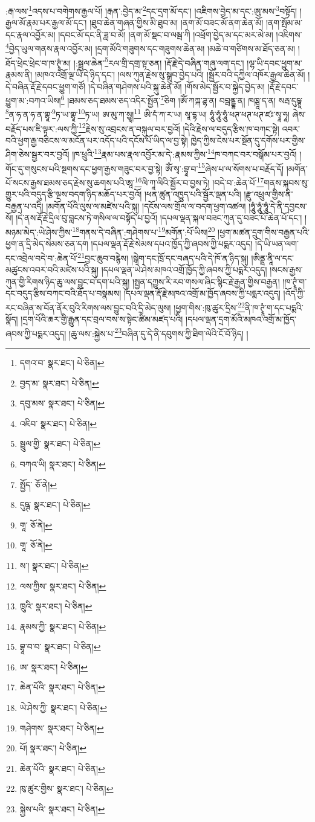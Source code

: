 :རྒ་ལས་\footnote{དགའ་བ་  སྣར་ཐང་།  པེ་ཅིན། }འདས་པ་བགེགས་རྒྱལ་པོ། །རྒན་:བྱེད་མ་\footnote{བྱད་མ་  སྣར་ཐང་།  པེ་ཅིན། }དང་དྲག་མོ་དང་། །འཇིགས་བྱེད་མ་དང་:ཨུ་མས་\footnote{དབུ་མས་  སྣར་ཐང་།  པེ་ཅིན། }བསྟོད། །རྒྱལ་མོ་རྣམ་པར་རྒྱལ་མོ་དང་། །ཐུབ་ཆེན་གཞན་གྱིས་མི་ཐུབ་མ། །ནག་མོ་བཟང་མོ་ནག་ཆེན་མོ། །ནག་སྤོམ་མ་དང་རྣལ་འབྱོར་མ། །དབང་མོ་དང་ནི་ཟླ་བ་མོ། །ནག་མོ་སྡང་བ་ལམྦ་ཀི །འཕྲོག་བྱེད་མ་དང་མར་མེ་མ། །འཇིགས་\footnote{འཇིབ་  སྣར་ཐང་།  པེ་ཅིན། }བྱེད་ཡུལ་གནས་རྣལ་འབྱོར་མ། །དྲག་མོའི་གཟུགས་དང་གཟུགས་ཆེན་མ། །མཆེ་བ་གཙིགས་མ་ཐོད་ཅན་མ། །ཐོད་ཕྲེང་ཕྲེང་བ་ཁ་ཊྭཱཾ་མ། །:སྦྲུལ་ཆེན་\footnote{སྦྲུལ་གྱི་  སྣར་ཐང་།  པེ་ཅིན། }རལ་གྲི་དགྲ་སྟ་ཅན། །རྡོ་རྗེ་དེ་བཞིན་གཞུ་ལག་དང་། །ལྷ་ཡི་དབང་ཕྱུག་མ་རྣམས་ནི། །མཁའ་འགྲོ་ལྔ་ཡི་དེ་ཉིད་དང་། །ལས་ཀུན་རྗེས་སུ་སྒྲུབ་བྱེད་པའི། །སྦྱོར་བའི་དཀྱིལ་འཁོར་རྒྱལ་ཆེན་མོ། །དེ་བཞིན་རྡོ་རྗེ་དབང་ཕྱུག་གཙོ། །དེ་བཞིན་གཤེགས་པའི་སྐུ་ཆེན་མོ། །གོས་མེད་སྦྱོར་བ་སྐྱེད་བྱེད་མ། །རྡོ་རྗེ་དབང་ཕྱུག་མ་:བཀའ་ཡིས།\footnote{བཀའ་ཡི།  སྣར་ཐང་།  པེ་ཅིན། } །ཐམས་ཅད་ཐམས་ཅད་འདིར་སྤྱོན་\footnote{སྤྱོད་  ཅོ་ནེ། }ཅིག །ཨོཾ་ཀཀྐ་ཌྷ་ན། བབྦནྡྷ་ན། ཁཁྑཱ་ད་ན། སརྦ་དུཥྚཱ་\footnote{དུཥྚ་  སྣར་ཐང་།  པེ་ཅིན། }ན་ཧ་ན་ཧ་ན་གྷཱ་\footnote{གཱ་  ཅོ་ནེ། }ཏ་ཡ་གྷཱ་\footnote{གཱ་  ཅོ་ནེ། }ཏ་ཡ། ཨ་མུ་ཀ་སྱཱ།\footnote{ས་།  སྣར་ཐང་།  པེ་ཅིན། } ཨི་དཾ་ཀ་ར་ཡ། སཱ་དྷ་ཡ། ཧཱུཾ་ཧཱུཾ་ཧཱུཾ་ཕཊ་ཕཊ་ཕཊ་ཛཿ་སྭཱ་ཧཱ། ཞེས་བརྗོད་པས་ཇི་ལྟར་:ལས་ཀྱི་\footnote{ལས་ཀྱིས་  སྣར་ཐང་།  པེ་ཅིན། }རྗེས་སུ་འབྲངས་ན་བསྐུལ་བར་བྱའོ། །དེའི་རྗེས་ལ་བདུད་རྩིས་ཁ་བཀང་སྟེ། འབར་བའི་ཕྱག་རྒྱ་བཅིངས་ལ་མངོན་པར་འདོད་པའི་དངོས་པོ་ཡིད་ལ་བྱ་སྟེ། ཁྱེད་ཀྱིས་ངེས་པར་སྔོན་དུ་དགོས་པར་གྱིས་ཤིག་ཅེས་སྦྱར་བར་བྱའོ། །ཁ་ཕྲུའི་\footnote{ཁྲུའི་  སྣར་ཐང་།  པེ་ཅིན། }རྣམ་པས་རྣལ་འབྱོར་མ་དེ་:རྣམས་ཀྱིས་\footnote{རྣམས་ཀྱི་  སྣར་ཐང་།  པེ་ཅིན། }ཁ་བཀང་བར་བསྒོམ་པར་བྱའོ། །གོང་དུ་གསུངས་པའི་སྔགས་དང་ཕྱག་རྒྱས་གཟུང་བར་བྱ་སྟེ། ཨོཾ་སྭ་:བྷཱ་བ་\footnote{བྷཱ་བ་བ་  སྣར་ཐང་།  པེ་ཅིན། }ཞེས་པ་ལ་སོགས་པ་བརྗོད་དོ། །མགོན་པོ་སངས་རྒྱས་ཐམས་ཅད་རྗེས་སུ་ཆགས་པའི་ཨཱ་\footnote{ཨ་  སྣར་ཐང་།  པེ་ཅིན། }ལི་ཀཱ་ལིའི་སྦྱོར་བ་བྱས་ཏེ། །བདེ་བ་:ཆེན་པོ་\footnote{ཆེན་པོའི་  སྣར་ཐང་།  པེ་ཅིན། }གནས་སྐབས་སུ་གྱུར་པའི་བདུད་རྩི་ལྔས་བདག་ཉིད་མཆོད་པར་བྱའོ། །ཕན་ཚུན་འཁྱུད་པའི་སྦྱོར་ལྡན་པའི། །རྫུ་འཕྲུལ་གྱིས་ནི་བརྒྱན་པ་འདི། །མགོན་པོའི་ལུས་ལ་མཛེས་པའི་སྐུ། །དངོས་ལས་གྲོལ་ལ་བདག་ཕྱག་འཚལ། །ཧཱུཾ་ཧཱུཾ་ཧཱུཾ་དེ་ནི་དབྱངས་སོ། །དེ་ནས་རྡོ་རྗེ་དྲིལ་བུ་བླངས་ཏེ་གསིལ་ལ་བསྟོད་པ་བྱའོ། །དཔལ་ལྡན་སྐལ་བཟང་ཀུན་དུ་བཟང་པོ་ཆེན་པོ་དང་། །མཉམ་མེད་:ཡེ་ཤེས་ཀྱིས་\footnote{ཡེ་ཤེས་ཀྱི་  སྣར་ཐང་།  པེ་ཅིན། }གནས་དེ་བཞིན་:གཤེགས་པ་\footnote{གཤེགས་  སྣར་ཐང་།  པེ་ཅིན། }མགོན་:པོ་ཡིས།\footnote{པོ།  སྣར་ཐང་།  པེ་ཅིན། } །ཕྱག་མཚན་དྲུག་གིས་བརྒྱན་པའི་ཕྱག་ན་དྲི་མེད་སེམས་ཅན་དག །དཔལ་ལྡན་རྡོ་རྗེ་སེམས་དཔའ་ཁྱོད་ཀྱི་ཞབས་ཀྱི་པདྨར་འདུད། །དེ་ཡི་ཡན་ལག་དང་འབྲེལ་བདེ་བ་:ཆེན་པོ་\footnote{ཆེན་པོའི་  སྣར་ཐང་།  པེ་ཅིན། }བྱང་ཆུབ་བརྙེས། །སྒེག་དང་ཁྲོ་དང་བཞད་པའི་དེ་ཁོ་ན་ཉིད་སྐུ། །ཨིནྡྲ་ནཱི་ལ་དང་མཚུངས་འབར་བའི་མཛེས་པའི་སྐུ། །དཔལ་ལྡན་ཡེ་ཤེས་མཁའ་འགྲོ་ཁྱོད་ཀྱི་ཞབས་ཀྱི་པདྨར་འདུད། །སངས་རྒྱས་ཀུན་གྱི་རིགས་ཉིད་ཆུ་ལས་བྱུང་བ་དག་པའི་སྐུ། །སྤྱན་དཀྱུས་རི་རབ་གསལ་ཞིང་སྙིང་རྗེ་རྒྱན་གྱིས་བརྒྱན། །ཁ་ཊྭཱཾ་ག་དང་བདུད་རྩིས་བཀང་བའི་ཐོད་པ་བསྣམས། །དཔལ་ལྡན་རྡོ་རྗེ་མཁའ་འགྲོ་མ་ཁྱོད་ཞབས་ཀྱི་པདྨར་འདུད། །འོད་ཀྱི་རང་བཞིན་ས་བོན་ནོར་བུའི་རིགས་ལས་བྱུང་བའི་དྲི་མེད་ལུས། །ཕྱག་གིས་:ཁུ་ཚུར་དྲིས་\footnote{ཁུ་ཚུར་གྱིས་  སྣར་ཐང་།  པེ་ཅིན། }ནི་ཁ་ཊྭཱཾ་ག་དང་པདྨའི་སྣོད། །དྲག་པོའི་ཆར་གྱི་རྒྱུན་དང་བྲལ་བས་ས་སྟེང་ཚིམ་མཛད་པའི། །དཔལ་ལྡན་དྲག་མོའི་མཁའ་འགྲོ་མ་ཁྱོད་ཞབས་ཀྱི་པདྨར་འདུད། །ཆུ་ལས་:སྐྱེས་པ་\footnote{སྐྱེས་པའི་  སྣར་ཐང་།  པེ་ཅིན། }བཞིན་དུ་དེ་ནི་དབུགས་ཀྱི་ཐིག་ལེའི་ངོ་བོ་ཉིད། །
